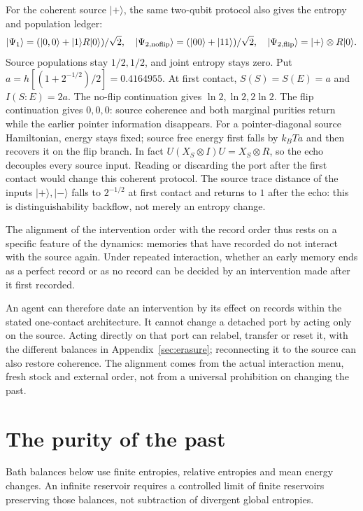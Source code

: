 \documentclass[12pt,a4paper]{article}
\begin{document}
For the coherent source \(|+\rangle\), the same two-qubit protocol
also gives the entropy and population ledger:
\[
 |\Psi_1\rangle=(|0,0\rangle+|1\rangle R|0\rangle)/\sqrt2,\quad
 |\Psi_{2,\rm noflip}\rangle=(|00\rangle+|11\rangle)/\sqrt2,\quad
 |\Psi_{2,\rm flip}\rangle=|+\rangle\otimes R|0\rangle .
\]
Source populations stay \(1/2,1/2\), and joint entropy stays zero.
Put \(a=h[(1+2^{-1/2})/2]=0.4164955\).
At first contact, \(S(S)=S(E)=a\) and \(I(S:E)=2a\).
The no-flip continuation gives \(\ln2,\ln2,2\ln2\).
The flip continuation gives \(0,0,0\): source coherence and both
marginal purities return while the earlier pointer information disappears.
For a pointer-diagonal source Hamiltonian, energy stays fixed; source
free energy first falls by \(k_BT a\) and then recovers it on the flip
branch. In fact \(U(X_S\otimes I)U=X_S\otimes R\), so the echo
decouples every source input. Reading or discarding the port after the
first contact would change this coherent protocol.
The source trace distance of the inputs \(|+\rangle,|-\rangle\)
falls to \(2^{-1/2}\) at first contact and returns to \(1\) after the
echo: this is distinguishability backflow, not merely an entropy change.

The alignment of the intervention order with the record order thus rests on a specific feature of the dynamics: memories that have recorded do not interact with the source again. Under repeated interaction, whether an early memory ends as a perfect record or as no record can be decided by an intervention made after it first recorded.

An agent can therefore date an intervention by its effect on records
within the stated one-contact architecture. It cannot change a detached
port by acting only on the source. Acting directly on that port can
relabel, transfer or reset it, with the different balances in
Appendix~\ref{sec:erasure};
reconnecting it to the source can also restore coherence. The alignment
comes from the actual interaction menu, fresh stock and external order,
not from a universal prohibition on changing the past.

\section{The purity of the past}
\label{sec:purity}

Bath balances below use finite entropies, relative entropies and mean
energy changes. An infinite reservoir requires a controlled limit of
finite reservoirs preserving those balances, not subtraction of divergent
global entropies.
\end{document}
